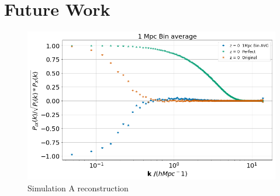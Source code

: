 \section{Future Work}


\begin{figure}
    \centering
    \includegraphics[width=1\columnwidth]{images/realRecon/1MpcBinAvg.png}%
    
    \caption{
        Simulation A reconstruction
    }
    
    \label{fig:12}
\end{figure}

